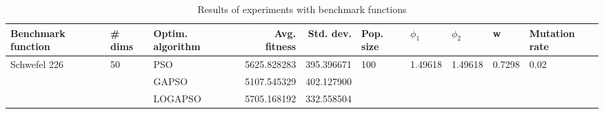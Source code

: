 \begin{table}
\centering
\caption{Results of experiments with benchmark functions}
\begin{tabular}{lllrrlllll}
\toprule
           Benchmark function &             \# dims & Optim. algorithm &  Avg. fitness &  Std. dev. &            Pop. size &               $\phi_{1}$ &               $\phi_{2}$ &                       w &         Mutation rate \\
\midrule
\multirow{3}{*}{Schwefel 226} & \multirow{3}{*}{50} &              PSO &   5625.828283 & 395.396671 & \multirow{3}{*}{100} & \multirow{3}{*}{1.49618} & \multirow{3}{*}{1.49618} & \multirow{3}{*}{0.7298} & \multirow{3}{*}{0.02} \\
                              &                     &            GAPSO &   5107.545329 & 402.127900 &                      &                          &                          &                         &                       \\
                              &                     &          LOGAPSO &   5705.168192 & 332.558504 &                      &                          &                          &                         &                       \\
\bottomrule
\end{tabular}
\end{table}
